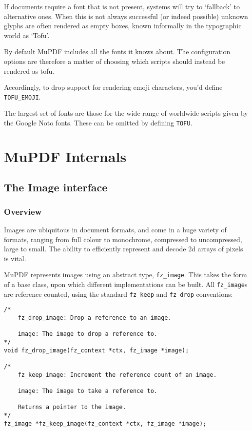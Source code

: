 \documentclass[oneside]{book}
\begin{document}
If documents require a font that is not present, systems will try to `fallback' to alternative ones. When this is not always successful (or indeed possible) unknown glyphs are often rendered as empty boxes, known informally in the typographic world as `Tofu'.

By default MuPDF includes all the fonts it knows about. The configuration options are therefore a matter of choosing which scripts should instead be rendered as tofu.

Accordingly, to drop support for rendering emoji characters, you'd define \texttt{TOFU\_EMOJI}.

The largest set of fonts are those for the wide range of worldwide scripts given by the Google Noto fonts. These can be omitted by defining \texttt{TOFU}.

\part{MuPDF Internals}
\chapter{The Image interface}
\label{Image}

\section{Overview}

Images are ubiquitous in document formats, and come in a huge variety of formats, ranging from full colour to monochrome, compressed to uncompressed, large to small. The ability to efficiently represent and decode 2d arrays of pixels is vital.

MuPDF represents images using an abstract type, \texttt{fz\_image}. This takes the form of a base class, upon which different implementations can be built. All \texttt{fz\_image}s are reference counted, using the standard \texttt{fz\_keep} and \texttt{fz\_drop} conventions:

\begin{lstlisting}
/*
	fz_drop_image: Drop a reference to an image.

	image: The image to drop a reference to.
*/
void fz_drop_image(fz_context *ctx, fz_image *image);

/*
	fz_keep_image: Increment the reference count of an image.

	image: The image to take a reference to.

	Returns a pointer to the image.
*/
fz_image *fz_keep_image(fz_context *ctx, fz_image *image);
\end{lstlisting}
\end{document}
